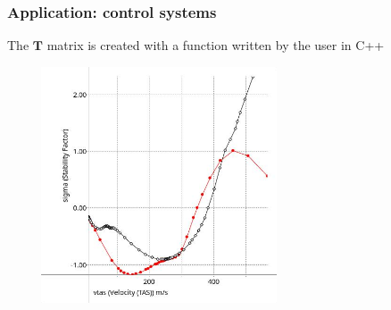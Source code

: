 \documentclass{beamer}
\newcommand{\Matrix}[1]{\boldsymbol{#1}}
\begin{document}
\begin{frame}
	\frametitle{Application: control systems}
	The $\Matrix{T}$ matrix is created with a function
	written by the user in C++

	\includegraphics[height=7cm,width=9cm]{controls.jpg}
\end{frame}
\end{document}

